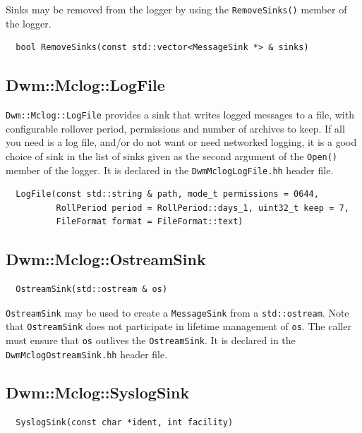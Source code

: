 Sinks may be removed from the logger by using the \texttt{RemoveSinks()}
member of the logger.

\begin{verbatim}
  bool RemoveSinks(const std::vector<MessageSink *> & sinks)
\end{verbatim}

\subsection{Dwm::Mclog::LogFile}

\texttt{Dwm::Mclog::LogFile} provides a sink that writes logged messages
to a file, with configurable rollover period, permissions and number of
archives to keep.  If all you need is a log file, and/or do not want or
need networked logging, it is a good choice of sink in the list of sinks
given as the second argument of the \texttt{Open()} member of the logger.
It is declared in the \texttt{DwmMclogLogFile.hh} header file.

\begin{verbatim}
  LogFile(const std::string & path, mode_t permissions = 0644,
          RollPeriod period = RollPeriod::days_1, uint32_t keep = 7,
          FileFormat format = FileFormat::text)
\end{verbatim}

\subsection{Dwm::Mclog::OstreamSink}

\begin{verbatim}
  OstreamSink(std::ostream & os)
\end{verbatim}

\texttt{OstreamSink} may be used to create a \texttt{MessageSink} from
a \texttt{std::ostream}.  Note that \texttt{OstreamSink} does not
participate in lifetime management of \texttt{os}.  The caller must
ensure that \texttt{os} outlives the \texttt{OstreamSink}.  It is declared
in the \texttt{DwmMclogOstreamSink.hh} header file.

\subsection{Dwm::Mclog::SyslogSink}

\begin{verbatim}
  SyslogSink(const char *ident, int facility)
\end{verbatim}

